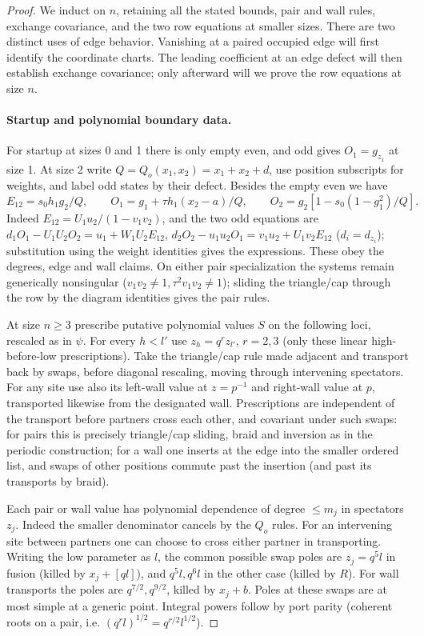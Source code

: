 \begin{proof}
We induct on $n$, retaining all the stated bounds, pair and wall rules,
exchange covariance, and the two row equations at smaller sizes.
There are two distinct uses of edge behavior. Vanishing at a paired
occupied edge will first identify the coordinate charts. The leading
coefficient at an edge defect will then establish exchange covariance;
only afterward will we prove the row equations at size $n$.

\paragraph{Startup and polynomial boundary data.} For startup at sizes 0 and 1 there is only empty even, and odd gives \(O_1=g_{z_1}\) at size 1. At size 2 write \(Q=Q_o(x_1,x_2)=x_1+x_2+d\), use position subscripts for weights, and label odd states by their defect. Besides the empty even we have
\[
 E_{12}=s_0 h_1 g_2/Q,\qquad
 O_1=g_1+\tau h_1(x_2-a)/Q,\qquad O_2=g_2[1-s_0(1-g_1^2)/Q].
\]
Indeed \(E_{12}=U_1u_2/(1-v_1v_2)\), and the two odd equations are
\(d_1 O_1-U_1U_2 O_2=u_1+W_1U_2 E_{12}\),
\(d_2 O_2-u_1u_2 O_1=v_1u_2+U_1 v_2 E_{12}\) (\(d_i=d_{z_i}\)); substitution using the weight identities gives the expressions. These obey the degrees, edge and wall claims. On either pair specialization the systems remain generically nonsingular (\(v_1v_2\ne1,\tau^2 v_1v_2\ne1\)); sliding the triangle/cap through the row by the diagram identities gives the pair rules.

At size \(n\ge3\) prescribe putative polynomial values \(S\) on the following loci, rescaled as in \(\psi\). For every \(h<l'\) use \(z_h=q^r z_{l'}\), \(r=2,3\) (only these linear high-before-low prescriptions). Take the triangle/cap rule made adjacent and transport back by swaps, before diagonal rescaling, moving through intervening spectators. For any site use also its left-wall value at \(z=p^{-1}\) and right-wall value at \(p\), transported likewise from the designated wall. Prescriptions are independent of the transport before partners cross each other, and covariant under such swaps: for pairs this is precisely triangle/cap sliding, braid and inversion as in the periodic construction; for a wall one inserts at the edge into the smaller ordered list, and swaps of other positions commute past the insertion (and past its transports by braid).

Each pair or wall value has polynomial dependence of degree \(\le m_j\) in spectators \(z_j\). Indeed the smaller denominator cancels by the \(Q_o\) rules. For an intervening site between partners one can choose to cross either partner in transporting. Writing the low parameter as \(l\), the common possible swap poles are \(z_j=q^5 l\) in fusion (killed by \(x_j+[q l]\)), and \(q^5 l,q^6 l\) in the other case (killed by \(R\)). For wall transports the poles are \(q^{7/2},q^{9/2}\), killed by \(x_j+b\). Poles at these swaps are at most simple at a generic point. Integral powers follow by port parity (coherent roots on a pair, i.e. \((q^r l)^{1/2}=q^{r/2}l^{1/2}\)). 


\end{proof}
